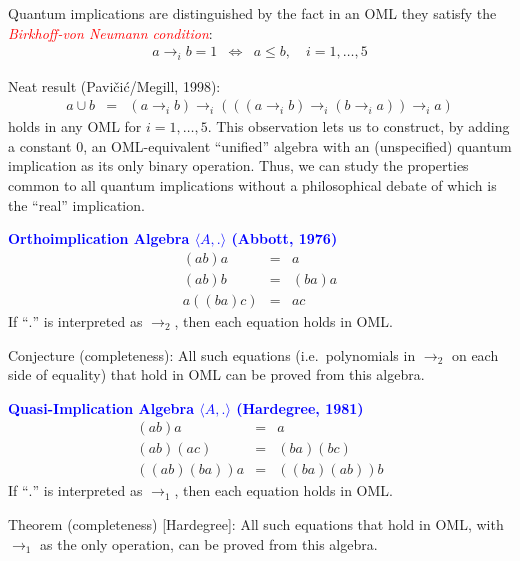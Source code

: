 \documentclass{slides}
\begin{document}
\begin{slide}
Quantum implications are distinguished by the fact
in an OML they
satisfy the \textcolor{red}{{\it Birkhoff-von Neumann condition}}:
\begin{eqnarray}
a\to_i b=1 & \Leftrightarrow & a\le b, \quad i=1,\ldots,5
\end{eqnarray}

Neat result (Pavi\v ci\'c/Megill, 1998):
\begin{eqnarray}
a\cup b&=&(a\rightarrow_i b)\rightarrow_i(((a
\rightarrow_i b)\rightarrow_i(b \to_i a))\rightarrow_i a)
\end{eqnarray}
holds in any OML for $i=1,\ldots,5$.  This observation lets us to
construct, by adding a constant $0$, an OML-equivalent ``unified''
algebra with an (unspecified) quantum implication as its only
binary operation.  Thus, we can study the properties common to all
quantum implications without a philosophical debate of which is
the ``real'' implication.

\end{slide}

\begin{slide}

\textcolor{blue}{\textbf{Orthoimplication Algebra
$\langle A,.\rangle$ (Abbott, 1976)}}
\begin{eqnarray}
(ab)a & = & a\\
(ab)b & = & (ba)a\\
a((ba)c) & = & ac
\end{eqnarray}
If ``$.$'' is interpreted as $\to_2$, then each equation holds in OML.

Conjecture (completeness):  All such equations
(i.e.\ polynomials in $\to_2$ on each side of equality) that hold in OML
can be proved from this algebra.


\end{slide}


\begin{slide}



\textcolor{blue}{\textbf{Quasi-Implication Algebra
 $\langle A,.\rangle$ (Hardegree, 1981)}}
\begin{eqnarray}
(a b) a & = & a\\
(a b) (a c) & = & (b a) (b c)\\
((a b)(b a)) a & = & ((b a)
     (a b)) b
\end{eqnarray}
If ``$.$'' is interpreted as $\to_1$, then each equation holds in OML.

Theorem (completeness) [Hardegree]:  All such equations that hold in OML,
 with $\to_1$ as the
only operation, can be proved from this algebra.


\end{slide}
\end{document}

